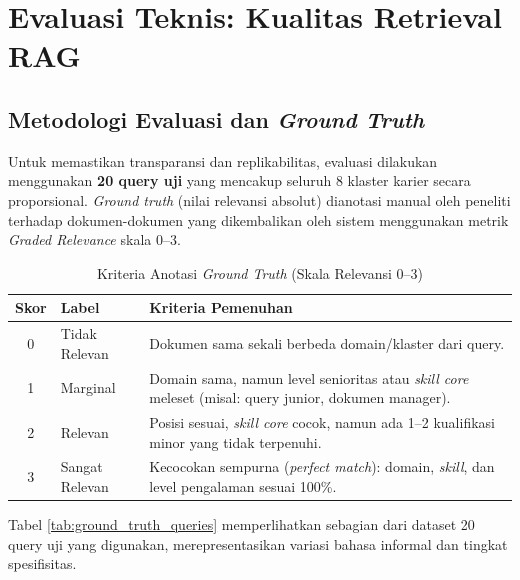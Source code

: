 \section{Evaluasi Teknis: Kualitas Retrieval RAG}

\subsection{Metodologi Evaluasi dan \textit{Ground Truth}}
\label{subsec:rag_eval_method}

Untuk memastikan transparansi dan replikabilitas, evaluasi dilakukan menggunakan
\textbf{20 query uji} yang mencakup seluruh 8 klaster karier secara proporsional.
\textit{Ground truth} (nilai relevansi absolut) dianotasi manual oleh peneliti
terhadap dokumen-dokumen yang dikembalikan oleh sistem menggunakan metrik
\textit{Graded Relevance} skala 0--3.

\begin{table}[H]
\centering
\caption{Kriteria Anotasi \textit{Ground Truth} (Skala Relevansi 0--3)}
\label{tab:relevance_criteria}
\begin{tabularx}{\textwidth}{c>{\hsize=0.25\hsize}X>{\hsize=0.75\hsize}X}
\toprule
\textbf{Skor} & \textbf{Label} & \textbf{Kriteria Pemenuhan} \\
\midrule
0 & Tidak Relevan & Dokumen sama sekali berbeda domain/klaster dari query. \\
1 & Marginal & Domain sama, namun level senioritas atau \textit{skill core} meleset (misal: query junior, dokumen manager). \\
2 & Relevan & Posisi sesuai, \textit{skill core} cocok, namun ada 1--2 kualifikasi minor yang tidak terpenuhi. \\
3 & Sangat Relevan & Kecocokan sempurna (\textit{perfect match}): domain, \textit{skill}, dan level pengalaman sesuai 100\%. \\
\bottomrule
\end{tabularx}
\end{table}

Tabel \ref{tab:ground_truth_queries} memperlihatkan sebagian dari dataset 20 query
uji yang digunakan, merepresentasikan variasi bahasa informal dan tingkat spesifisitas.

